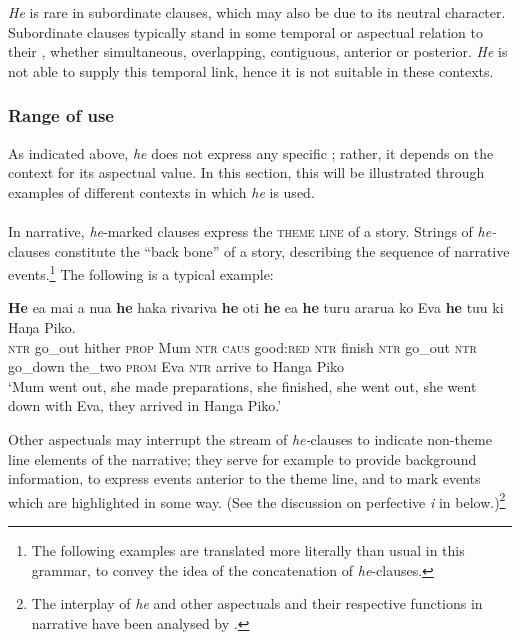 \textit{He} is rare in subordinate clauses, which may also be due to its neutral character. Subordinate clauses typically stand in some temporal or aspectual relation to their , whether simultaneous, overlapping, contiguous, anterior or posterior. \textit{He} is not able to supply this temporal link, hence it is not suitable in these contexts.

\subsubsection[Range of use]{Range of use}\label{sec:7.2.3.2}
\largerpage
As indicated above, \textit{he} does not express any specific ; rather, it depends on the context for its aspectual value. In this section, this will be illustrated through examples of different contexts in which \textit{he} is used.

\paragraph{}\label{sec:7.2.3.2.1} In narrative, \textit{he}{}-marked clauses express the \textsc{theme line} of a story. Strings of \textit{he-}clauses constitute the “back bone” of a story, describing the sequence of narrative events.\footnote{\label{fn:314}The following examples are translated more literally than usual in this grammar, to convey the idea of the concatenation of \textit{he}{}-clauses.} The following is a typical example:

\ea\label{ex:7.3}
\gll \textbf{He} e{\ꞌ}a mai a nua \textbf{he} haka rivariva \textbf{he} oti \textbf{he} e{\ꞌ}a  \textbf{he} turu ararua ko Eva \textbf{he} tu{\ꞌ}u ki Haŋa Piko.\\
\textsc{ntr} go\_out hither \textsc{prop} Mum \textsc{ntr} \textsc{caus} good:\textsc{red} \textsc{ntr} finish \textsc{ntr} go\_out  \textsc{ntr} go\_down the\_two \textsc{prom} Eva \textsc{ntr} arrive to Hanga Piko\\

\glt
‘Mum went out, she made preparations, she finished, she went out, she went down with Eva, they arrived in Hanga Piko.’ \textstyleExampleref{[R210.038]} 
\z

Other aspectuals may interrupt the stream of \textit{he-}clauses to indicate non-theme line elements of the narrative; they serve for example to provide background information, to express events anterior to the theme line, and to mark events which are highlighted in some way. (See the discussion on perfective \textit{i} in  below.)\footnote{\label{fn:315}The interplay of \textit{he} and other aspectuals and their respective functions in narrative have been analysed by \citet{WeberR2003}.} 

